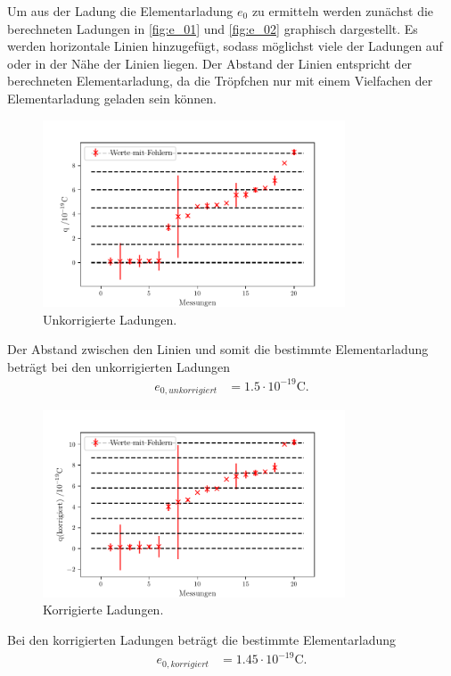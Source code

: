 Um aus der Ladung die Elementarladung $e_0$ zu ermitteln werden zunächst die berechneten Ladungen in \autoref{fig:e_01} und \autoref{fig:e_02} graphisch dargestellt.
Es werden horizontale Linien hinzugefügt, sodass möglichst viele der Ladungen auf oder in der Nähe der Linien liegen.
Der Abstand der Linien entspricht der berechneten Elementarladung, da die Tröpfchen nur mit einem Vielfachen der Elementarladung geladen sein können.

\begin{figure}[H]
        \centering
        \includegraphics[width=0.8\textwidth]{build/plot2.pdf}
        \caption {Unkorrigierte Ladungen.}
        \label{fig:e_01}
\end{figure}
Der Abstand zwischen den Linien und somit die bestimmte Elementarladung beträgt bei den unkorrigierten Ladungen
\begin{align*}
        e_{0,unkorrigiert}&= 1.5\cdot 10^{-19} \unit{\coulomb}.
\end{align*}
\begin{figure}[H]
        \centering
        \includegraphics[width=0.8\textwidth]{build/plot3.pdf}
        \caption {Korrigierte Ladungen.}
        \label{fig:e_02}
\end{figure}
Bei den korrigierten Ladungen beträgt die bestimmte Elementarladung
\begin{align*}
        e_{0,korrigiert}&= 1.45\cdot 10^{-19} \unit{\coulomb}.
\end{align*}

